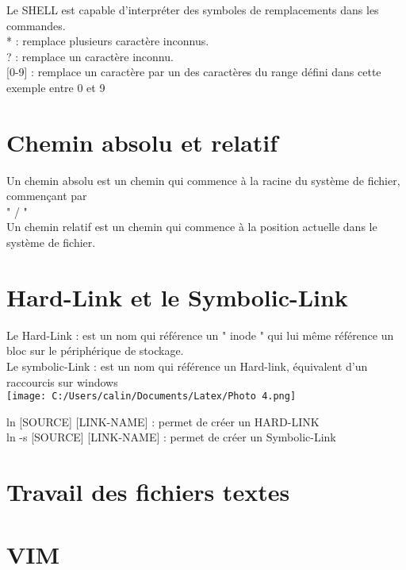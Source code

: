 \documentclass[11pt,a4peper]{article}
\begin{document}
Le SHELL est capable d’interpréter des symboles de remplacements dans les commandes.\\

* : remplace plusieurs caractère inconnus. \\

? : remplace un caractère inconnu. \\

[0-9] : remplace un caractère par un des caractères du range défini dans cette exemple entre 0 et 9\\

\section{Chemin absolu et relatif}

Un chemin absolu est un chemin qui commence à la racine du système de fichier, commençant par\\
" / "\\
Un chemin relatif est un chemin qui commence à la position actuelle dans le système de fichier. \\

\section{Hard-Link et le Symbolic-Link}

Le Hard-Link : est un nom qui référence un " inode " qui lui même référence un bloc sur le périphérique de stockage. \\

Le symbolic-Link : est un nom qui référence un Hard-link, équivalent d’un raccourcis sur windows\\

\texttt{[image: C:/Users/calin/Documents/Latex/Photo 4.png]} 

ln [SOURCE] [LINK-NAME] : permet de créer un HARD-LINK \\

ln -s [SOURCE] [LINK-NAME] : permet de créer un Symbolic-Link \\

\section{\textbf{Travail des fichiers textes}}

\section{VIM}
\end{document}
